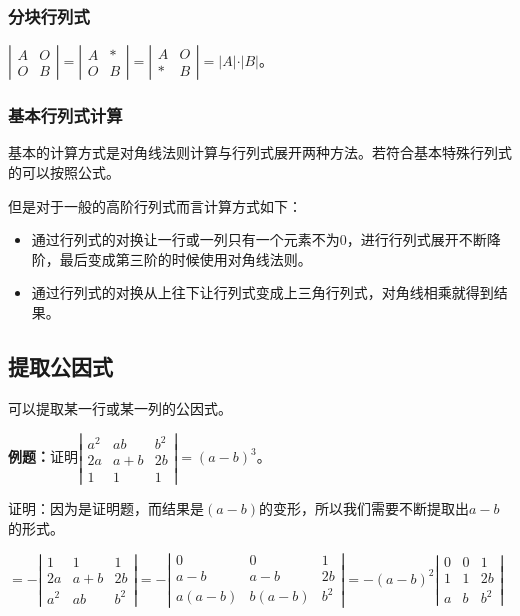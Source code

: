 \documentclass[UTF8, 12pt]{ctexart}
\begin{document}
\subsubsection{分块行列式}

$\left|\begin{array}{cc}
    A & O \\
    O & B
\end{array}\right|=
\left|\begin{array}{cc}
    A & * \\
    O & B
\end{array}\right|=
\left|\begin{array}{cc}
    A & O \\
    * & B
\end{array}\right|=\vert A\vert\cdot\vert B\vert$。

\subsubsection{基本行列式计算}

基本的计算方式是对角线法则计算与行列式展开两种方法。若符合基本特殊行列式的可以按照公式。

但是对于一般的高阶行列式而言计算方式如下：

\begin{itemize}
    \item 通过行列式的对换让一行或一列只有一个元素不为0，进行行列式展开不断降阶，最后变成第三阶的时候使用对角线法则。
    \item 通过行列式的对换从上往下让行列式变成上三角行列式，对角线相乘就得到结果。
\end{itemize}

\subsection{提取公因式}

可以提取某一行或某一列的公因式。

\textbf{例题：}证明$\left|\begin{array}{ccc} 
    a^2 & ab & b^2 \\
    2a & a+b & 2b \\
    1 & 1 & 1
\end{array}\right|=(a-b)^3$。

证明：因为是证明题，而结果是$(a-b)$的变形，所以我们需要不断提取出$a-b$的形式。

$=-\left|\begin{array}{ccc} 
    1 & 1 & 1 \\
    2a & a+b & 2b \\
    a^2 & ab & b^2
\end{array}\right|
=-\left|\begin{array}{ccc} 
    0 & 0 & 1 \\
    a-b & a-b & 2b \\
    a(a-b) & b(a-b) & b^2
\end{array}\right|
=-(a-b)^2\left|\begin{array}{ccc} 
    0 & 0 & 1 \\
    1 & 1 & 2b \\
    a & b & b^2
\end{array}\right|$
\end{document}
